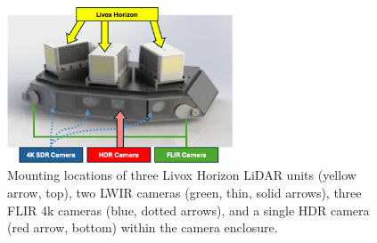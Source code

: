 \documentclass{erauthesis}
\begin{document}
\begin{figure}[htbp]
\centering
\includegraphics[width=0.6\textwidth]{Images/Camera_enclosure2.png}
\caption{Mounting locations of three Livox Horizon LiDAR units (yellow arrow, top), two LWIR cameras (green, thin, solid arrows), three FLIR 4k cameras (blue, dotted arrows), and a single \ac{HDR} camera  (red arrow, bottom) within the camera enclosure.}
\label{fig:camera_enclosure}
\end{figure}

\end{document}
